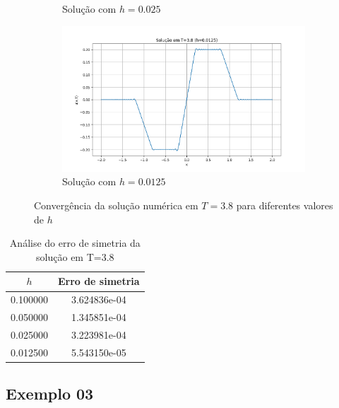 \documentclass[column,amsmath,amssymb,floatfix]{revtex4}
\begin{document}
\begin{figure}[H]
\begin{subfigure}{0.35\textwidth}
     \caption{Solução com $h=0.025$}
     \label{fig:ex2_3}
 \end{subfigure}
 \begin{subfigure}{0.35\textwidth}
     \includegraphics[width=\textwidth]{img/ex0204.png}
     \caption{Solução com $h=0.0125$}
     \label{fig:ex2_4}
 \end{subfigure}
 \caption{Convergência da solução numérica em $T=3.8$ para diferentes valores de $h$}
 \label{fig:ex2_conv}
\end{figure}

\begin{table}[H]
   \centering
   \caption{Análise do erro de simetria da solução em T=3.8}
   \label{tab:erro_simetria}
   \renewcommand{\arraystretch}{1.25}
   \setlength{\tabcolsep}{12pt}
   \begin{tabular}{|c|c|}
       \hline
       \textbf{$h$} & \textbf{Erro de simetria} \\ \hline
       0.100000 & 3.624836e-04 \\ \hline
       0.050000 & 1.345851e-04 \\ \hline
       0.025000 & 3.223981e-04 \\ \hline
       0.012500 & 5.543150e-05 \\ \hline
   \end{tabular}
\end{table}

\subsection{Exemplo 03}
\end{document}
